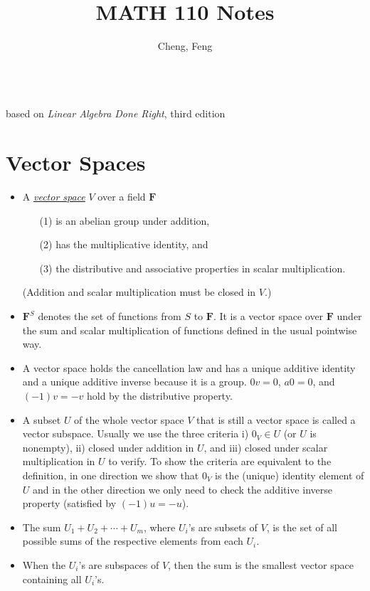 \documentclass{article}
\title{MATH 110 Notes}
\author{Cheng, Feng}
\newcommand{\df}[1]{\ul{\textit{#1}}}
\newcommand{\F}{\mathbf{F}}
\begin{document}
\makeatletter
\begin{center}
    {\Large \@title}
    \\based on \textit{Linear Algebra Done Right}, third edition
    \vspace{0.5em}
    \\ \@author
    \vspace{-0.5em}
\end{center}
\makeatother

\section{Vector Spaces}
\begin{itemize}
    \item A \df{vector space} $V$ over a field $\F$
    \begin{enumerate}
    \item [(1)] is an abelian group under addition,
    \item [(2)] has the multiplicative identity, and
    \item [(3)] the distributive and associative properties in scalar multiplication.
    \end{enumerate}
    (Addition and scalar multiplication must be closed in $V$.)
    \item $\F^S$ denotes the set of functions from $S$ to $\F$. It is a vector space over $\F$ under the sum and scalar multiplication of functions defined in the usual pointwise way.
    \item A vector space holds the cancellation law and has a unique additive identity and a unique additive inverse because it is a group. $0v = 0$, $a0 = 0$, and $(-1)v = -v$ hold by the distributive property.
    \item A subset $U$ of the whole vector space $V$ that is still a vector space is called a vector subspace. Usually we use the three criteria i) $0_V \in U$ (or $U$ is nonempty), ii) closed under addition in $U$, and iii) closed under scalar multiplication in $U$ to verify. To show the criteria are equivalent to the definition, in one direction we show that $0_V$ is the (unique) identity element of $U$ and in the other direction we only need to check the additive inverse property (satisfied by $(-1)u = -u$).
    \item The sum $U_1 + U_2 +\cdots+ U_m$, where $U_i$'s are subsets of $V$, is the set of all possible sums of the respective elements from each $U_i$.
    \item When the $U_i$'s are subspaces of $V$, then the sum is the smallest vector space containing all $U_i$'s.

\end{itemize}
\end{document}
